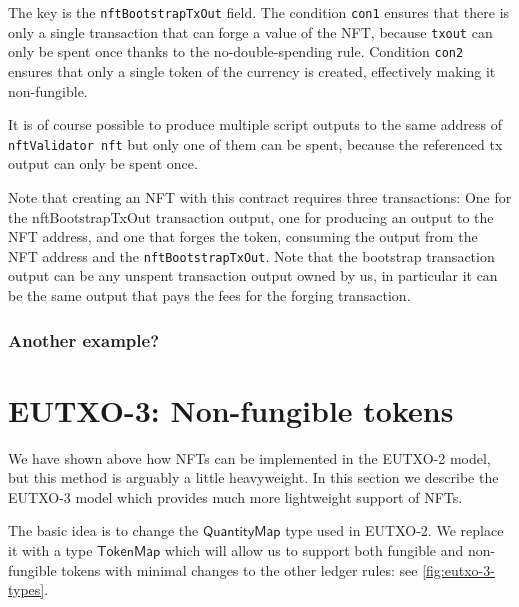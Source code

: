 \documentclass[a4paper]{article}
\newcommand{\s}{\textsf}  %
\theoremstyle{definition}  %
\newcommand{\qtymap}{\ensuremath{\s{QuantityMap}}}
\newcommand{\tokenmap}{\ensuremath{\s{TokenMap}}}
\begin{document}
The key is the \verb|nftBootstrapTxOut| field. The condition
\verb|con1| ensures that there is only a single transaction that can
forge a value of the NFT, because \verb|txout| can only be spent once
thanks to the no-double-spending rule. Condition \verb|con2| ensures
that only a single token of the currency is created, effectively
making it non-fungible.

It is of course possible to produce multiple script outputs to the
same address of \verb|nftValidator nft| but only one of them can be spent,
because the referenced tx output can only be spent once.

Note that creating an NFT with this contract requires three
transactions: One for the nftBootstrapTxOut transaction output, one
for producing an output to the NFT address, and one that forges the
token, consuming the output from the NFT address and the
\verb|nftBootstrapTxOut|. Note that the bootstrap transaction output can be
any unspent transaction output owned by us, in particular it can be
the same output that pays the fees for the forging transaction.

\subsubsection{Another example?}

\section{EUTXO-3: Non-fungible tokens}
\label{sec:eutxo-3}

We have shown above how NFTs can be implemented in the EUTXO-2 model,
but this method is arguably a little heavyweight.  In this section we
describe the EUTXO-3 model which provides much more lightweight
support of NFTs.

The basic idea is to change the \qtymap{} type used in EUTXO-2.  We
replace it with a type \tokenmap{} which will allow us to support both
fungible and non-fungible tokens with minimal changes to the
other ledger rules: see \cref{fig:eutxo-3-types}.

\newcommand{\mprime}{m^{\prime}}
\end{document}
